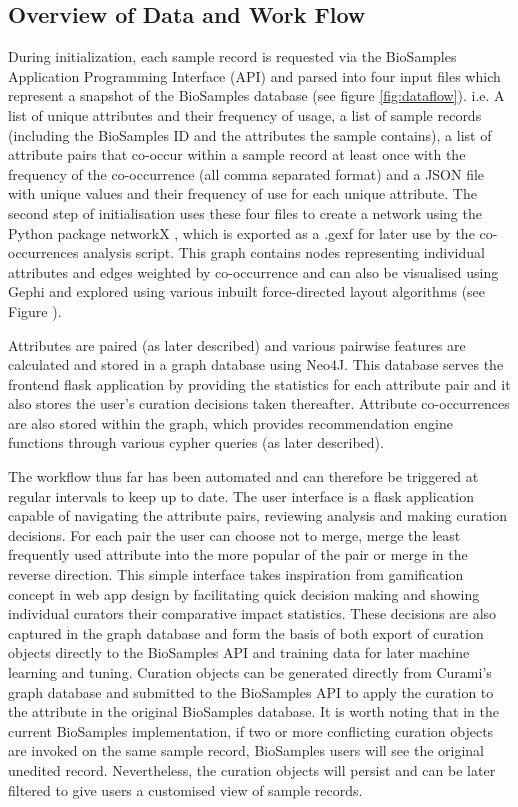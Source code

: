 \documentclass{bmcart}
\begin{document}
\subsection*{Overview of Data and Work Flow}

During initialization, each sample record is requested via the BioSamples Application Programming Interface (API) and parsed into four input files which represent a snapshot of the BioSamples database (see figure \ref{fig:dataflow}). i.e. A list of unique attributes and their frequency of usage, a list of sample records (including the BioSamples ID and the attributes the sample contains), a list of attribute pairs that co-occur within a sample record at least once with the frequency of the co-occurrence (all comma separated format) and a JSON file with unique values and their frequency of use for each unique attribute. The second step of initialisation uses these four files to create a network using the Python package networkX \cite{networkx}, which is exported as a .gexf for later use by the co-occurrences analysis script. This graph contains nodes representing individual attributes and edges weighted by co-occurrence and can also be visualised using Gephi \cite{bastian2009gephi} and explored using various inbuilt force-directed layout algorithms \cite{jacomy2014forceatlas2} (see Figure \cite{fig:gephi}).

Attributes are paired (as later described) and various pairwise features are calculated and stored in a graph database using Neo4J. This database serves the frontend flask application by providing the statistics for each attribute pair and it also stores the user's curation decisions taken thereafter. Attribute co-occurrences are also stored within the graph, which provides recommendation engine functions through various cypher queries (as later described).

The workflow thus far has been automated and can therefore be triggered at regular intervals to keep up to date. The user interface is a flask application capable of navigating the attribute pairs, reviewing analysis and making curation decisions. For each pair the user can choose not to merge, merge the least frequently used attribute into the more popular of the pair or merge in the reverse direction. This simple interface takes inspiration from gamification concept in web app design by facilitating quick decision making and showing individual curators their comparative impact statistics. These decisions are also captured in the graph database and form the basis of both export of curation objects directly to the BioSamples API and training data for later machine learning and tuning. Curation objects can be generated directly from Curami's graph database and submitted to the BioSamples API to apply the curation to the attribute in the original BioSamples database. It is worth noting that in the current BioSamples implementation, if two or more conflicting curation objects are invoked on the same sample record, BioSamples users will see the original unedited record. Nevertheless, the curation objects will persist and can be later filtered to give users a customised view of sample records. 
\end{document}
